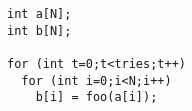 \begin{lstlisting}[morekeywords={g_qCount},belowskip=0pt]
int a[N];
int b[N];

for (int t=0;t<tries;t++)
  for (int i=0;i<N;i++)
    b[i] = foo(a[i]);
\end{lstlisting}
